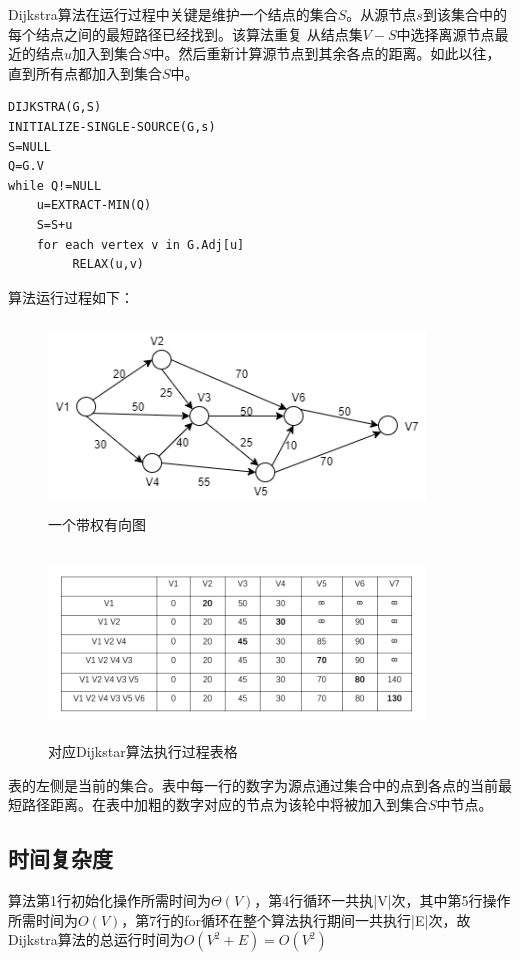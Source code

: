 Dijkstra算法在运行过程中关键是维护一个结点的集合$S$。从源节点$s$到该集合中的每个结点之间的最短路径已经找到。该算法重复
从结点集$V-S$中选择离源节点最近的结点$u$加入到集合$S$中。然后重新计算源节点到其余各点的距离。如此以往，直到所有点都加入到集合$S$中。

\begin{lstlisting}[caption=Dijkstra算法伪代码]
DIJKSTRA(G,S)
INITIALIZE-SINGLE-SOURCE(G,s)
S=NULL
Q=G.V
while Q!=NULL
	u=EXTRACT-MIN(Q)
	S=S+u
	for each vertex v in G.Adj[u]
		 RELAX(u,v)
\end{lstlisting}

算法运行过程如下：

\begin{figure}
\centering
\includegraphics[width=10cm,height=5cm]{image/dijkstra1.png}
\caption{一个带权有向图}
\end{figure}
\begin{figure}
\centering
\includegraphics[width=10cm,height=5cm]{image/dijkstra2.png}
\caption{对应Dijkstar算法执行过程表格}
\end{figure}

表的左侧是当前的集合。表中每一行的数字为源点通过集合中的点到各点的当前最短路径距离。在表中加粗的数字对应的节点为该轮中将被加入到集合$S$中节点。

\subsection{时间复杂度}
算法第1行初始化操作所需时间为$\Theta(V)$，第4行循环一共执|V|次，其中第5行操作所需时间为$O(V)$，第7行的for循环在整个算法执行期间一共执行|E|次，故Dijkstra算法的总运行时间为$O(V^2+E)=O(V^2)$

